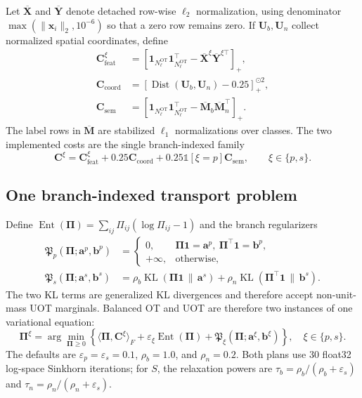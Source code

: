 \documentclass[10pt]{article}
\newcommand{\eps}{\varepsilon}
\newcommand{\ones}{\bm{1}}
\newcommand{\KL}{\operatorname{KL}}
\newcommand{\Ent}{\operatorname{Ent}}
\newcommand{\relu}[1]{\left[#1\right]_{+}}
\newcommand{\ind}{\mathbb{1}}
\begin{document}
Let $\overline{\bm X}$ and $\overline{\bm Y}$ denote detached row-wise
$\ell_2$ normalization, using denominator $\max(\|\bm x_i\|_2,10^{-6})$ so
that a zero row remains zero.  If $\bm U_b,\bm U_n$ collect normalized spatial
coordinates, define
\begin{equation}
\begin{aligned}
 \bm C_{\mathrm{feat}}^\xi
   &=\relu{\ones_{N_\ell^{\mathrm{OT}}}
             \ones_{N_\ell^{\mathrm{OT}}}^\top-
        \overline{\bm X}^{\xi}\overline{\bm Y}^{\xi\top}},\\
 \bm C_{\mathrm{coord}}
   &=\relu{\operatorname{Dist}(\bm U_b,\bm U_n)-0.25}^{\odot2},\\
 \bm C_{\mathrm{sem}}
   &=\relu{\ones_{N_\ell^{\mathrm{OT}}}
             \ones_{N_\ell^{\mathrm{OT}}}^\top-
        \overline{\bm M}_b\overline{\bm M}_n^\top}.
\end{aligned}
\label{eq:matrix-transport-costs}
\end{equation}
The label rows in $\overline{\bm M}$ are stabilized $\ell_1$ normalizations
over classes.  The two implemented costs are the single branch-indexed family
\begin{equation}
    \boxed{
    \bm C^\xi
    =\bm C_{\mathrm{feat}}^\xi
      +0.25\bm C_{\mathrm{coord}}
      +0.25\ind[\xi=p]\bm C_{\mathrm{sem}},
    \qquad \xi\in\{p,s\}.}
    \label{eq:unified-branch-cost}
\end{equation}

\subsection{One branch-indexed transport problem}

Define $\Ent(\bm\Pi)=\sum_{ij}\Pi_{ij}(\log\Pi_{ij}-1)$ and the branch
regularizers
\begin{equation}
\begin{aligned}
 \mathfrak P_p(\bm\Pi;\bm a^p,\bm b^p)
 &=\begin{cases}
   0,&\bm\Pi\ones=\bm a^p,\ \bm\Pi^\top\ones=\bm b^p,\\
   +\infty,&\text{otherwise},
   \end{cases}\\
 \mathfrak P_s(\bm\Pi;\bm a^s,\bm b^s)
 &=\rho_b\KL(\bm\Pi\ones\,\|\,\bm a^s)
   +\rho_n\KL(\bm\Pi^\top\ones\,\|\,\bm b^s).
\end{aligned}
\end{equation}
The two KL terms are generalized KL divergences and therefore accept
non-unit-mass UOT marginals.
Balanced OT and UOT are therefore two instances of one variational equation:
\begin{equation}
\boxed{
    \bm\Pi^\xi
    =\arg\min_{\bm\Pi\geq0}
      \left\{
      \langle\bm\Pi,\bm C^\xi\rangle_F
      +\eps_\xi\Ent(\bm\Pi)
      +\mathfrak P_\xi(\bm\Pi;\bm a^\xi,\bm b^\xi)
      \right\},
    \quad \xi\in\{p,s\}.}
    \label{eq:master-transport}
\end{equation}
The defaults are $\eps_p=\eps_s=0.1$, $\rho_b=1.0$, and $\rho_n=0.2$.
Both plans use 30 float32 log-space Sinkhorn iterations; for $S$, the relaxation powers
are $\tau_b=\rho_b/(\rho_b+\eps_s)$ and
$\tau_n=\rho_n/(\rho_n+\eps_s)$.
\end{document}
